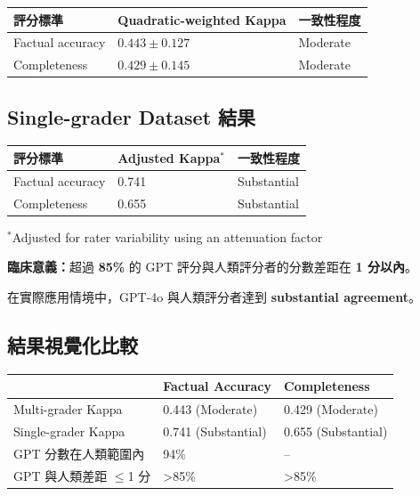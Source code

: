 \documentclass[12pt,a4paper]{article}
\begin{document}
\begin{center}
\begin{tabular}{p{5cm}p{4cm}p{4cm}}
\toprule
\textbf{評分標準} & \textbf{Quadratic-weighted Kappa} & \textbf{一致性程度} \\
\midrule
Factual accuracy & $0.443 \pm 0.127$ & Moderate \\
\midrule
Completeness & $0.429 \pm 0.145$ & Moderate \\
\bottomrule
\end{tabular}
\end{center}


\subsection{Single-grader Dataset 結果}

\begin{center}
\begin{tabular}{p{5cm}p{4cm}p{4cm}}
\toprule
\textbf{評分標準} & \textbf{Adjusted Kappa}$^*$ & \textbf{一致性程度} \\
\midrule
Factual accuracy & 0.741 & Substantial \\
\midrule
Completeness & 0.655 & Substantial \\
\bottomrule
\end{tabular}
\end{center}

{\small $^*$Adjusted for rater variability using an attenuation factor}

\begin{importantbox}
\textbf{臨床意義：}超過 \textbf{85\%} 的 GPT 評分與人類評分者的分數差距在 \textbf{1 分以內}。

在實際應用情境中，GPT-4o 與人類評分者達到 \textbf{substantial agreement}。
\end{importantbox}

\subsection{結果視覺化比較}

\begin{center}
\begin{tabular}{p{4cm}p{4cm}p{4cm}}
\toprule
 & \textbf{Factual Accuracy} & \textbf{Completeness} \\
\midrule
Multi-grader Kappa & 0.443 (Moderate) & 0.429 (Moderate) \\
\midrule
Single-grader Kappa & 0.741 (Substantial) & 0.655 (Substantial) \\
\midrule
GPT 分數在人類範圍內 & 94\% & -- \\
\midrule
GPT 與人類差距 $\leq$1 分 & >85\% & >85\% \\
\bottomrule
\end{tabular}
\end{center}
\end{document}
